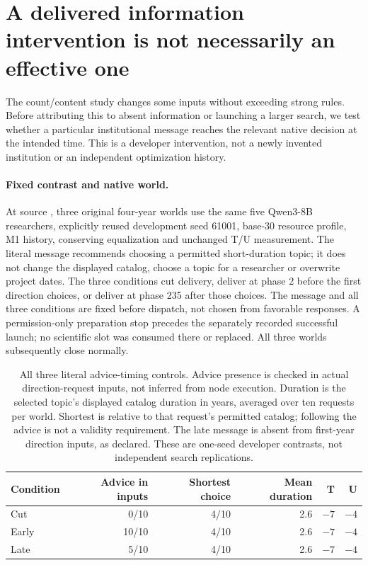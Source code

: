 \section{A delivered information intervention is not necessarily an effective one}
\label{sec:native-advice}
\FloatBarrier

The count/content study changes some inputs without exceeding strong rules.
Before attributing this to absent information or launching a larger search,
we test whether a particular institutional message reaches the relevant native
decision at the intended time. This is a developer intervention, not a newly
invented institution or an independent optimization history.

\paragraph{Fixed contrast and native world.}
At source , three original four-year worlds use the same five
Qwen3-8B researchers, explicitly reused development seed 61001, base-30 resource
profile, M1 history, conserving equalization and unchanged T/U measurement.
The literal message recommends choosing a permitted short-duration topic; it
does not change the displayed catalog, choose a topic for a researcher or
overwrite project dates. The three conditions cut delivery, deliver at phase 2
before the first direction choices, or deliver at phase 235 after those choices.
The message and all three conditions are fixed before dispatch, not chosen
from favorable responses. A permission-only preparation stop precedes the
separately recorded successful launch; no scientific slot was consumed there
or replaced. All three worlds subsequently close normally.

\begin{table}[!ht]
\centering\small
\begin{tabular}{lrrrrr}
\toprule
Condition & Advice in inputs & Shortest choice & Mean duration & T & U\\
\midrule
Cut &0/10 &4/10 &2.6 & $-7$ & $-4$\\
Early &10/10 &4/10 &2.6 & $-7$ & $-4$\\
Late &5/10 &4/10 &2.6 & $-7$ & $-4$\\
\bottomrule
\end{tabular}
\caption{All three literal advice-timing controls. Advice presence is checked
in actual direction-request inputs, not inferred from node execution.
Duration is the selected topic's displayed catalog duration in years, averaged
over ten requests per world. Shortest is relative to that request's permitted
catalog; following the advice is not a validity requirement. The late message
is absent from first-year direction inputs, as declared. These are one-seed
developer contrasts, not independent search replications.}
\label{tab:native-advice}
\end{table}

